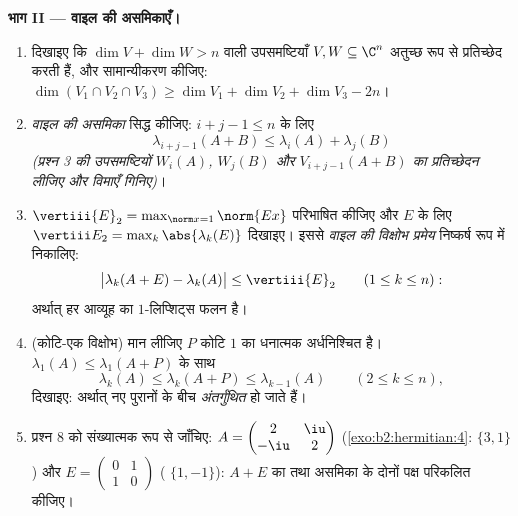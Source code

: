 \begin{problem}
\medskip
\noindent\textbf{भाग II --- वाइल की असमिकाएँ।}
\begin{enumerate}[resume]
  \item दिखाइए कि $\dim V
        + \dim W > n$ वाली उपसमष्टियाँ $V, W \subseteq \C^n$ अतुच्छ रूप से प्रतिच्छेद करती
        हैं, और सामान्यीकरण कीजिए: $\dim(V_1 \cap V_2 \cap V_3) \geq \dim V_1 + \dim V_2 +
        \dim V_3 - 2n$।
  \item \emph{वाइल की असमिका} सिद्ध कीजिए: $i + j - 1 \leq n$ के लिए
        \[
        \lambda_{i+j-1}(A + B) \leq \lambda_i(A) +
        \lambda_j(B)
        \]
        \emph{(प्रश्न 3 की उपसमष्टियों $W_i(A)$, $W_j(B)$ और $V_{i+j-1}(A+B)$ का प्रतिच्छेदन
        लीजिए और विमाएँ गिनिए)}।
  \item $\vertiii{E}_2 = \max_{\norm x = 1}\norm{Ex}$ परिभाषित कीजिए और  $E$ के लिए $\vertiii E_2 = \max_k\abs{\lambda_k(E)}$ दिखाइए। इससे
        \emph{वाइल की विक्षोभ प्रमेय} निष्कर्ष रूप में निकालिए:
        \[
        \bigl|\lambda_k(A + E) - \lambda_k(A)\bigr| \leq
        \vertiii{E}_2
        \qquad (1 \leq k \leq n) :
        \]
        अर्थात् हर  आव्यूह का $1$-लिप्शिट्स फलन है।
  \item (कोटि-एक विक्षोभ) मान लीजिए $P$ कोटि $1$ का  धनात्मक
        अर्धनिश्चित है। $\lambda_1(A) \leq \lambda_1(A+P)$ के साथ
        \[
        \lambda_k(A) \leq \lambda_k(A + P) \leq
        \lambda_{k-1}(A) \qquad (2 \leq k \leq n),
        \]
        दिखाइए: अर्थात् नए  पुरानों के बीच
        \emph{अंतर्गुंथित} हो जाते हैं।
  \item प्रश्न 8 को संख्यात्मक रूप से जाँचिए: $A = \begin{pmatrix} 2 &
        \iu\\ -\iu & 2\end{pmatrix}$ (\cref{exo:b2:hermitian:4}:  $\{3, 1\}$)
        और
        $E = \begin{pmatrix} 0 & 1\\ 1 & 0\end{pmatrix}$
        ( $\{1, -1\}$): $A +
        E$ का  तथा असमिका के दोनों पक्ष
        परिकलित कीजिए।
\end{enumerate}


\end{problem}
